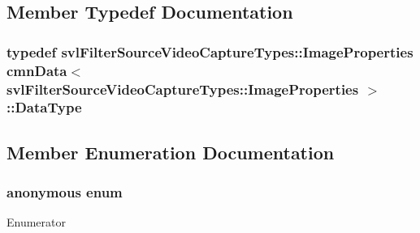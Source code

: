 \subsection{Member Typedef Documentation}
\hypertarget{classcmn_data_3_01svl_filter_source_video_capture_types_1_1_image_properties_01_4_a5e4f9ec9d3c7fa6c707332abbc73cf39}{
\subsubsection[{Data\-Type}]{\setlength{\rightskip}{0pt plus 5cm}typedef {\bf svl\-Filter\-Source\-Video\-Capture\-Types\-::\-Image\-Properties} {\bf cmn\-Data}$<$ {\bf svl\-Filter\-Source\-Video\-Capture\-Types\-::\-Image\-Properties} $>$\-::{\bf Data\-Type}}}\label{classcmn_data_3_01svl_filter_source_video_capture_types_1_1_image_properties_01_4_a5e4f9ec9d3c7fa6c707332abbc73cf39}


\subsection{Member Enumeration Documentation}
\hypertarget{classcmn_data_3_01svl_filter_source_video_capture_types_1_1_image_properties_01_4_a08ae77ffd1f342f19e1acc7e38ca6cb7}{\subsubsection[{anonymous enum}]{\setlength{\rightskip}{0pt plus 5cm}anonymous enum}}\label{classcmn_data_3_01svl_filter_source_video_capture_types_1_1_image_properties_01_4_a08ae77ffd1f342f19e1acc7e38ca6cb7}
\begin{Desc}
\item[Enumerator]\par
\begin{description}
\item[{\em 
\hypertarget{classcmn_data_3_01svl_filter_source_video_capture_types_1_1_image_properties_01_4_a08ae77ffd1f342f19e1acc7e38ca6cb7a70e556b7255e5604e78fbc82545e271b}{I\-S\-\_\-\-S\-P\-E\-C\-I\-A\-L\-I\-Z\-E\-D}\label{classcmn_data_3_01svl_filter_source_video_capture_types_1_1_image_properties_01_4_a08ae77ffd1f342f19e1acc7e38ca6cb7a70e556b7255e5604e78fbc82545e271b}
}]\end{description}
\end{Desc}


